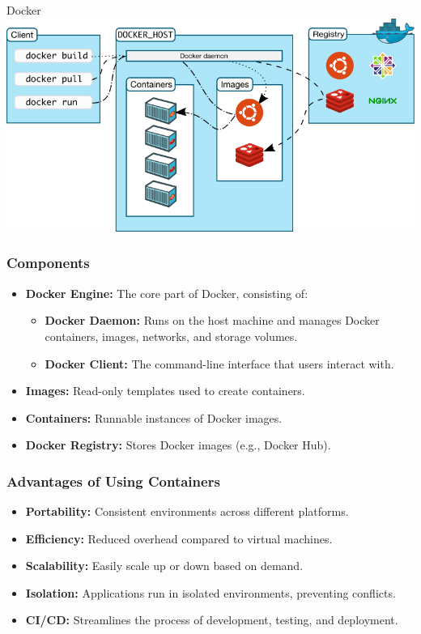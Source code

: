 \documentclass[aspectratio=169, table]{beamer}
\begin{document}
    \begin{frame}{Docker}
        \vspace{30pt}
        \includegraphics[width=\textwidth]{../../images/docker.png}
    \end{frame}

    \begin{frame}
        \frametitle{Components}
        \begin{itemize}
            \item \textbf{Docker Engine:} The core part of Docker, consisting of:
            \begin{itemize}
                \item \textbf{Docker Daemon:} Runs on the host machine and manages Docker containers, images, networks, and storage volumes.
                \item \textbf{Docker Client:} The command-line interface that users interact with.
            \end{itemize}
            \item \textbf{Images:} Read-only templates used to create containers.
            \item \textbf{Containers:} Runnable instances of Docker images.
            \item \textbf{Docker Registry:} Stores Docker images (e.g., Docker Hub).
        \end{itemize}
    \end{frame}

    \begin{frame}
        \frametitle{Advantages of Using Containers}
        \begin{itemize}
            \item \textbf{Portability:} Consistent environments across different platforms.
            \item \textbf{Efficiency:} Reduced overhead compared to virtual machines.
            \item \textbf{Scalability:} Easily scale up or down based on demand.
            \item \textbf{Isolation:} Applications run in isolated environments, preventing conflicts.
            \item \textbf{CI/CD:} Streamlines the process of development, testing, and deployment.
        \end{itemize}
    \end{frame}
\end{document}
